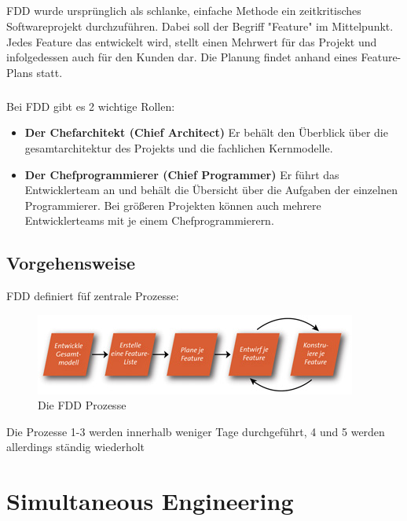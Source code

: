 \documentclass[a4paper, twopage]{scrreprt}
\begin{document}
\paragraph*{}
FDD wurde ursprünglich als schlanke, einfache Methode ein zeitkritisches Softwareprojekt durchzuführen. Dabei soll der Begriff "Feature" im Mittelpunkt. Jedes Feature das entwickelt wird, stellt einen Mehrwert für das Projekt und infolgedessen auch für den Kunden dar. 
Die Planung findet anhand eines Feature-Plans statt. 
\paragraph*{}
Bei FDD gibt es 2 wichtige Rollen:
\begin{itemize}
	\item \textbf{Der Chefarchitekt (Chief Architect)} \newline
		Er behält den Überblick über die gesamtarchitektur des Projekts und die fachlichen Kernmodelle.
	\item \textbf{Der Chefprogrammierer (Chief Programmer)} \newline
		Er führt das Entwicklerteam an und behält die Übersicht über die Aufgaben der einzelnen Programmierer. Bei größeren Projekten können auch mehrere Entwicklerteams mit je einem Chefprogrammierern.
\end{itemize}
\section{Vorgehensweise}
FDD definiert füf zentrale Prozesse:
\begin{figure}[h]
\centering
	\includegraphics[scale=1]{Images/fdd_prozesse}
	\caption[FDD-Prozesse]{Die FDD Prozesse\cite{wikipedia:fdd}}
	\label{fig:fdd}
\end{figure}
Die Prozesse 1-3 werden innerhalb weniger Tage durchgeführt, 4 und 5 werden allerdings ständig wiederholt

\chapter{Simultaneous Engineering}
\end{document}
